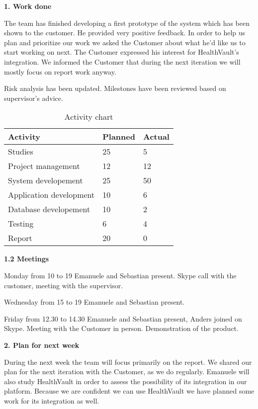 \textbf{1. Work done}

The team has finished developing a first prototype of the system which has been shown to the customer. 
He provided very positive feedback.
In order to help us plan and prioritize our work we asked the Customer about what he’d like us to start working on next. 
The Customer expressed his interest for HealthVault's integration. 
We informed the Customer that during the next iteration we will mostly focus on report work anyway.

Risk analysis has been updated. Milestones have been reviewed based on supervisor’s advice.

\begin{table}[H]
\begin{center}
\begin{tabular}{ l | l | l }
  \hline
  Activity & Planned & Actual \\
  \hline\noalign{\smallskip}\noalign{\smallskip}\hline
  Studies & 25 & 5 \\
  Project management & 12 & 12 \\
  System developement & 25 & 50 \\
  Application development & 10 & 6 \\
  Database developement & 10 & 2 \\
  Testing & 6 & 4 \\
  Report & 20 & 0 \\
  \hline
\end{tabular}
\end{center}
\caption{Activity chart}
\label{table:activityChartStatusReportWeek38}
\end{table}

\textbf{1.2 Meetings}

Monday from 10 to 19
Emanuele and Sebastian present.
Skype call with the customer, meeting with the supervisor.

Wednesday from 15 to 19
Emanuele and Sebastian present.

Friday from 12.30 to 14.30
Emanuele and Sebastian present, Anders joined on Skype.
Meeting with the Customer in person. Demonstration of the product.

\textbf{2. Plan for next week}

During the next week the team will focus primarily on the report.
We shared our plan for the next iteration with the Customer, as we do regularly. 
Emanuele will also study HealthVault in order to assess the possibility of its integration in our platform. 
Because we are confident we can use HealthVault  we have planned some work for its integration as well.

